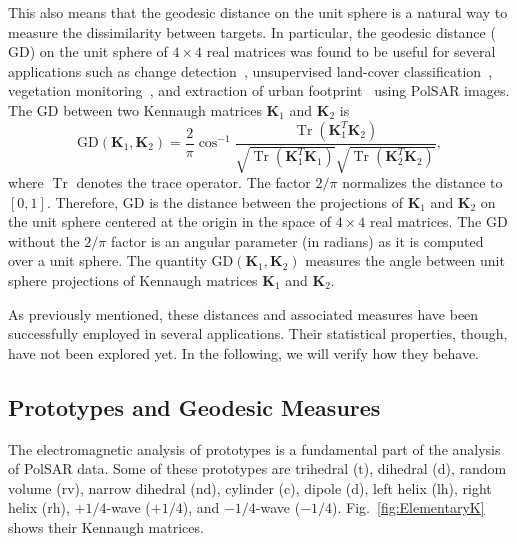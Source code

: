 \documentclass[journal]{IEEEtran}
\DeclareMathOperator{\Tr}{Tr}
\begin{document}
This also means that the geodesic distance on the unit sphere is a natural way to measure the dissimilarity between targets. 
In particular, the geodesic distance ($\text{GD}$) on the unit sphere of $4 \times 4$ real matrices was found to be useful for several applications such as change detection~\cite{ChangeDetectionPolSARGeodesicDistanceBetweenScatteringMechanisms}, 
unsupervised land-cover classification~\cite{ClassificationPolSARGeodesic}, 
vegetation monitoring~\cite{AGeneralizedVolumeScatteringModelBasedVegetationIndexfromPolarimetricSARData2019}, and 
extraction of urban footprint~\cite{NovelTechniquesforBuiltupAreaExtractionfromPolarimetricSARImages2019} using PolSAR images. 
The $\text{GD}$ between two Kennaugh matrices $\bm{K}_1$ and $\bm{K}_2$ is
\begin{equation}
\text{GD}(\bm{K}_1,\bm{K}_2) =  \frac{2}{\pi} \cos^{-1}\frac{\Tr(\bm{K}_1^T\bm{K}_2)}{\sqrt{\Tr(\bm{K}_1^T\bm{K}_1)}\sqrt{\Tr(\bm{K}_2^T\bm{K}_2)}} ,
\label{eq:GD_Ken}
\end{equation}
where $\Tr$ denotes the trace operator. 
The factor $2/\pi$ normalizes the distance to $[0,1]$. 
Therefore, $\text{GD}$ is the distance between the projections of $\bm{K}_1$ and $\bm{K}_2$ on the unit sphere centered at the origin in the space of $4 \times 4$ real matrices. 
The $\text{GD}$ without the $2/\pi$ factor is an angular parameter (in radians) as it is computed over a unit sphere. 
The quantity $\text{GD}(\bm{K}_1, \bm{K}_2)$ measures the angle between unit sphere projections of Kennaugh matrices $\bm{K}_1$ and  $\bm{K}_2$.

As previously mentioned, these distances and associated measures have been successfully employed in several applications.
Their statistical properties, though, have not been explored yet.
In the following, we will verify how they behave.



\subsection{Prototypes and Geodesic Measures}

The electromagnetic analysis of prototypes is a fundamental part of the analysis of PolSAR data.
Some of these prototypes are
{trihedral} ($\text{t}$), 
{dihedral} ($\text{d}$), 
{random volume} ($\text{rv}$), 
{narrow dihedral} ($\text{nd}$), 
{cylinder}  ($\text{c}$), 
{dipole}  ($\text{d}$), 
{left helix} ($\text{lh}$), 
{right helix} ($\text{rh}$), 
{$+1/4$-wave} ($+1/4$), 
and {$-1/4$-wave} ($-1/4$).
Fig.~\ref{fig:ElementaryK} shows their Kennaugh matrices.
\end{document}
